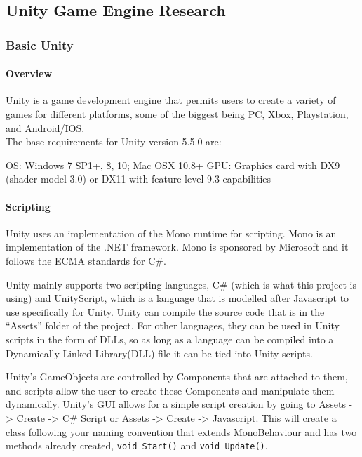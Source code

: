 \documentclass[12pt]{article}
\begin{document}
\subsection{Unity Game Engine
Research}\label{unity-game-engine-research}

\subsubsection{Basic Unity}\label{basic-unity}

\paragraph{Overview}\label{overview-1}

Unity is a game development engine that permits users to create a
variety of games for different platforms, some of the biggest being PC,
Xbox, Playstation, and Android/IOS.\\
The base requirements for Unity version 5.5.0 are:

OS: Windows 7 SP1+, 8, 10; Mac OSX 10.8+ GPU: Graphics card with DX9
(shader model 3.0) or DX11 with feature level 9.3 capabilities

\paragraph{Scripting}\label{scripting}

Unity uses an implementation of the Mono runtime for scripting. Mono is
an implementation of the .NET framework. Mono is sponsored by Microsoft
and it follows the ECMA standards for C\#.

Unity mainly supports two scripting languages, C\# (which is what this
project is using) and UnityScript, which is a language that is modelled
after Javascript to use specifically for Unity. Unity can compile the
source code that is in the ``Assets'' folder of the project. For other
languages, they can be used in Unity scripts in the form of DLLs, so as
long as a language can be compiled into a Dynamically Linked
Library(DLL) file it can be tied into Unity scripts.

Unity's GameObjects are controlled by Components that are attached to
them, and scripts allow the user to create these Components and
manipulate them dynamically. Unity's GUI allows for a simple script
creation by going to Assets -\textgreater{} Create -\textgreater{} C\#
Script or Assets -\textgreater{} Create -\textgreater{} Javascript. This
will create a class following your naming convention that extends
MonoBehaviour and has two methods already created,
\texttt{void\ Start()} and \texttt{void\ Update()}.
\end{document}
